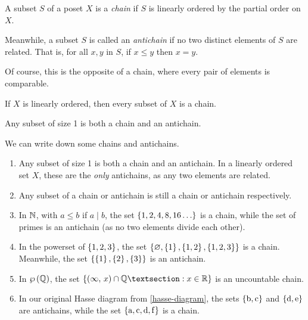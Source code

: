 \documentclass{article}
\begin{document}
\begin{definition}
	\label{chain-antichain}
    A subset $S$ of a poset $X$ is a \textit{chain} if $S$ is linearly ordered by the partial order on $X$.
    
    Meanwhile, a subset $S$ is called an \textit{antichain} if no two distinct elements of $S$ are related. That is, for all $x, y$ in $S$, if $x \leq y$ then $x = y$.
    
    Of course, this is the opposite of a chain, where every pair of elements is comparable.
\end{definition}

\begin{corollary}
    If $X$ is linearly ordered, then every subset of $X$ is a chain.
\end{corollary}

\begin{corollary}
    Any subset of size 1 is both a chain and an antichain.
\end{corollary}

\begin{example}
	We can write down some chains and antichains.
    \begin{enumerate}
    	\item Any subset of size 1 is both a chain and an antichain. In a linearly ordered set $X$, these are the \textit{only} antichains, as any two elements are related.
    	\item Any subset of a chain or antichain is still a chain or antichain respectively.
    	\item In $\mathbb{N}$, with $a \leq b$ if $a \mid b$, the set $\set{1, 2, 4, 8, 16 \dots}$ is a chain, while the set of primes is an antichain (as no two elements divide each other).
    	\item In the powerset of $\left\lbrace 1, 2, 3 \right\rbrace$, the set $\left\lbrace \varnothing, \left\lbrace 1 \right\rbrace, \left\lbrace 1, 2 \right\rbrace, \left\lbrace 1, 2, 3 \right\rbrace \right\rbrace$ is a chain. Meanwhile, the set $\left\lbrace \left\lbrace 1 \right\rbrace, \left\lbrace 2 \right\rbrace, \left\lbrace 3 \right\rbrace \right\rbrace$ is an antichain.
    	\item In $\wp\left(\mathbb{Q}\right)$, the set $\set{\intervalOO{\infty}{x} \cap \Q§ : x \in \R}$ is an uncountable chain.
    	\item In our original Hasse diagram from \ref{hasse-diagram}, the sets $\left\lbrace \mathrm{b, c} \right\rbrace$ and $\left\lbrace \mathrm{d, e} \right\rbrace$ are antichains, while the set $\left\lbrace \mathrm{a, c, d, f} \right\rbrace$ is a chain.
	\end{enumerate}
\end{example}
\end{document}
